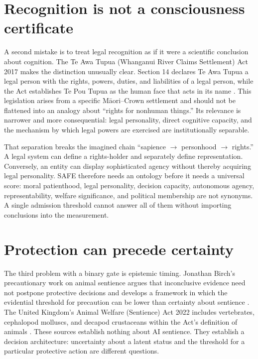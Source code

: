 \documentclass[11pt]{article}
\begin{document}
\section{Recognition is not a consciousness certificate}
A second mistake is to treat legal recognition as if it were a scientific conclusion about cognition. The Te Awa Tupua (Whanganui River Claims Settlement) Act 2017 makes the distinction unusually clear. Section 14 declares Te Awa Tupua a legal person with the rights, powers, duties, and liabilities of a legal person, while the Act establishes Te Pou Tupua as the human face that acts in its name \parencite{TeAwaTupua2017}. This legislation arises from a specific Māori--Crown settlement and should not be flattened into an analogy about ``rights for nonhuman things.'' Its relevance is narrower and more consequential: legal personality, direct cognitive capacity, and the mechanism by which legal powers are exercised are institutionally separable.

That separation breaks the imagined chain ``sapience $\rightarrow$ personhood $\rightarrow$ rights.'' A legal system can define a rights-holder and separately define representation. Conversely, an entity can display sophisticated agency without thereby acquiring legal personality. SAFE therefore needs an ontology before it needs a universal score: moral patienthood, legal personality, decision capacity, autonomous agency, representability, welfare significance, and political membership are not synonyms. A single admission threshold cannot answer all of them without importing conclusions into the measurement.

\section{Protection can precede certainty}
The third problem with a binary gate is epistemic timing. Jonathan Birch's precautionary work on animal sentience argues that inconclusive evidence need not postpone protective decisions and develops a framework in which the evidential threshold for precaution can be lower than certainty about sentience \parencite{Birch2017Sentience}. The United Kingdom's Animal Welfare (Sentience) Act 2022 includes vertebrates, cephalopod molluscs, and decapod crustaceans within the Act's definition of animals \parencite{AnimalWelfareSentienceAct2022}. These sources establish nothing about AI sentience. They establish a decision architecture: uncertainty about a latent status and the threshold for a particular protective action are different questions.
\end{document}
